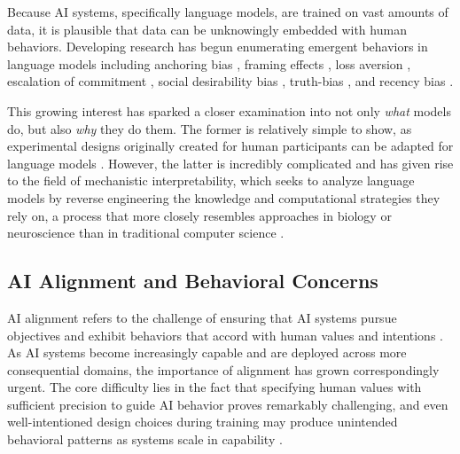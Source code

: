 Because AI systems, specifically language models, are trained on vast amounts of data, it is plausible that data can be unknowingly embedded with human behaviors. Developing research has begun enumerating emergent behaviors in language models including anchoring bias \citep{Lou-2024-Anchoring}, framing effects \citep{Lior-2025-WildFrame}, loss aversion \citep{Jia-2024-Decision}, escalation of commitment \citep{Barkett-2025-GettingOut}, social desirability bias \citep{Salecha-2024-Large}, truth-bias \citep{Barkett-2025-Reasoning, Markowitz-2023-Generative}, and recency bias \citep{Li-2024-NeedleBench}. 

This growing interest has sparked a closer examination into not only \textit{what} models do, but also \textit{why} they do them. The former is relatively simple to show, as experimental designs originally created for human participants can be adapted for language models \citep{Aher-2022-UsingLLMs, Anthis-2025-LLM}. However, the latter is incredibly complicated and has given rise to the field of mechanistic interpretability, which seeks to analyze language models by reverse engineering the knowledge and computational strategies they rely on, a process that more closely resembles approaches in biology or neuroscience than in traditional computer science \citep{Sharkey-2025-OpenProblemsInMechTerp, Bereska-2024-Mechanistic, McAleese-2025-MechTerp}.

\subsection{AI Alignment and Behavioral Concerns}

AI alignment refers to the challenge of ensuring that AI systems pursue objectives and exhibit behaviors that accord with human values and intentions \citep{Christian-2020-AlignmentProblem, Gabriel-2020-ArtificialIntelligenceValues}. As AI systems become increasingly capable and are deployed across more consequential domains, the importance of alignment has grown correspondingly urgent. The core difficulty lies in the fact that specifying human values with sufficient precision to guide AI behavior proves remarkably challenging, and even well-intentioned design choices during training may produce unintended behavioral patterns as systems scale in capability \citep{Amodei-2016-Concrete, Ngo-2022-AlignmentProblemDeepLearning}.

